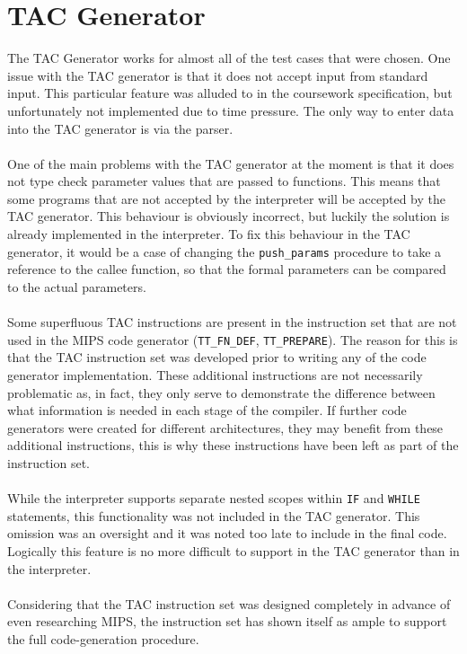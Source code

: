 \section{TAC Generator}
The TAC Generator works for almost all of the test cases that were chosen. One issue with the TAC generator is that it does not accept input from standard input. This particular feature was alluded to in the coursework specification, but unfortunately not implemented due to time pressure. The only way to enter data into the TAC generator is via the parser. 
\ \\ \ \\
One of the main problems with the TAC generator at the moment is that it does not type check parameter values that are passed to functions. This means that some programs that are not accepted by the interpreter will be accepted by the TAC generator. This behaviour is obviously incorrect, but luckily the solution is already implemented in the interpreter. To fix this behaviour in the TAC generator, it would be a case of changing the \verb!push_params! procedure to take a reference to the callee function, so that the formal parameters can be compared to the actual parameters.
\ \\ \ \\
Some superfluous TAC instructions are present in the instruction set that are not used in the MIPS code generator (\verb!TT_FN_DEF!, \verb!TT_PREPARE!). The reason for this is that the TAC instruction set was developed prior to writing any of the code generator implementation. These additional instructions are not necessarily problematic as, in fact, they only serve to demonstrate the difference between what information is needed in each stage of the compiler. If further code generators were created for different architectures, they may benefit from these additional instructions, this is why these instructions have been left as part of the instruction set.
\ \\ \ \\
While the interpreter supports separate nested scopes within \verb!IF! and \verb!WHILE! statements, this functionality was not included in the TAC generator. This omission was an oversight and it was noted too late to include in the final code. Logically this feature is no more difficult to support in the TAC generator than in the interpreter.
\ \\ \ \\
Considering that the TAC instruction set was designed completely in advance of even researching MIPS, the instruction set has shown itself as ample to support the full code-generation procedure.

